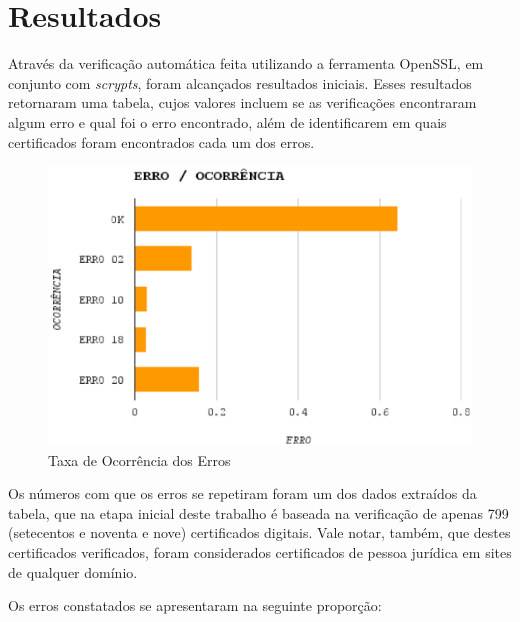 

\chapter[Resultados]{Resultados}

	Através da verificação automática feita utilizando a ferramenta OpenSSL, em conjunto com \textit{scrypts}, foram alcançados resultados iniciais. Esses resultados retornaram uma tabela, cujos valores incluem se as verificações encontraram algum erro e qual foi o erro encontrado, além de identificarem em quais certificados foram encontrados cada um dos erros.

	\begin{figure}[h]
		\centering
		\caption{Taxa de Ocorrência dos Erros}
		\label{graph01}
		\includegraphics[keepaspectratio=true,scale=1]{figuras/graph01.eps}
	\end{figure}

	Os números com que os erros se repetiram foram um dos dados extraídos da tabela, que na etapa inicial deste trabalho é baseada na verificação de apenas 799 (setecentos e noventa e nove) certificados digitais. Vale notar, também, que destes certificados verificados, foram considerados certificados de pessoa jurídica em sites de qualquer domínio.

	Os erros constatados se apresentaram na seguinte proporção:

